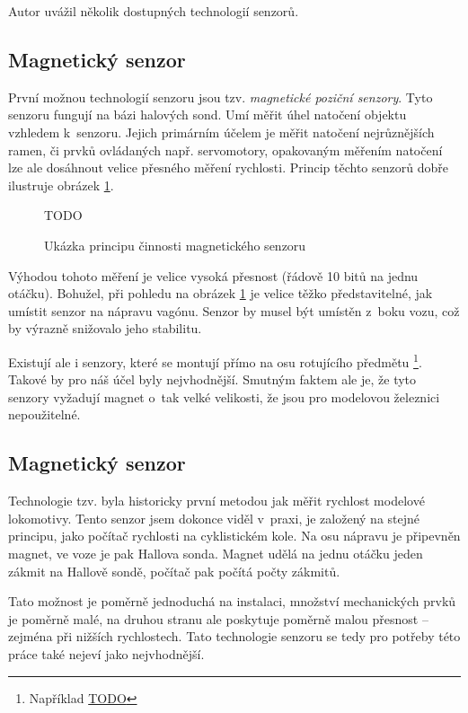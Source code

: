 Autor uvážil několik dostupných technologií senzorů.

\subsection{Magnetický senzor}
\label{subsec:wsm-senzor-mag}

První možnou technologií senzoru jsou tzv. \textit{magnetické poziční senzory}.
Tyto senzoru fungují na bázi halových sond. Umí měřit úhel natočení objektu
vzhledem k~senzoru. Jejich primárním účelem je měřit natočení nejrůznějších
ramen, či prvků ovládaných např. servomotory, opakovaným měřením natočení lze
ale dosáhnout velice přesného měření rychlosti. Princip těchto senzorů
dobře ilustruje obrázek \ref{fig:magnetic-sensor}.

\begin{figure}[h]
TODO
\caption{Ukázka principu činnosti magnetického senzoru}
\label{fig:magnetic-sensor}
\end{figure}

Výhodou tohoto měření je velice vysoká přesnost (řádově 10 bitů na jednu
otáčku). Bohužel, při pohledu na obrázek
\ref{fig:magnetic-sensor} je velice těžko představitelné, jak umístit senzor na
nápravu vagónu. Senzor by musel být umístěn z~boku vozu, což by výrazně
snižovalo jeho stabilitu.

Existují ale i senzory, které se montují přímo na osu rotujícího předmětu
\footnote{Například \url{TODO}}. Takové by pro náš účel byly nejvhodnější.
Smutným faktem ale je, že tyto senzory vyžadují magnet o~tak velké velikosti,
že jsou pro modelovou železnici nepoužitelné.

\subsection{Magnetický senzor }
\label{subsec:wsm-senzor-cyclo}

Technologie tzv.  byla historicky první metodou jak měřit
rychlost modelové lokomotivy. Tento senzor jsem dokonce viděl v~praxi, je
založený na stejné principu, jako počítač rychlosti na cyklistickém kole.
Na osu nápravu je připevněn magnet, ve voze je pak Hallova sonda. Magnet udělá
na jednu otáčku jeden zákmit na Hallově sondě, počítač pak počítá počty zákmitů.

Tato možnost je poměrně jednoduchá na instalaci, množství mechanických prvků
je poměrně malé, na druhou stranu ale poskytuje poměrně malou přesnost --
zejména při nižších rychlostech. Tato technologie senzoru se tedy pro potřeby
této práce také nejeví jako nejvhodnější.


